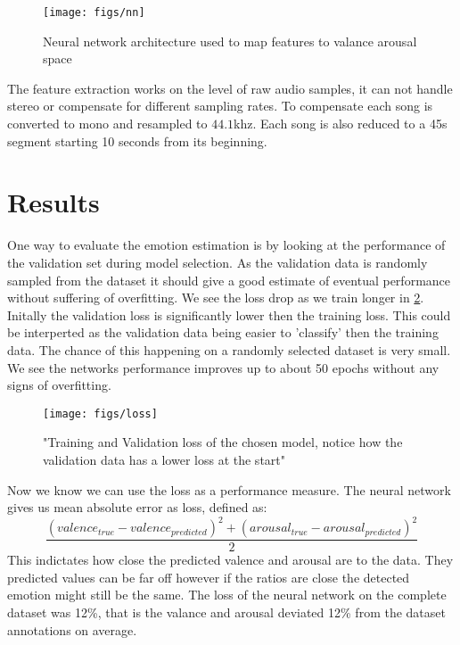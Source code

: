 \documentclass[lang=en, hanging-titles=true]{skrapport}
\begin{document}
\begin{figure}[h]
	\centering
	\texttt{[image: figs/nn]}
	\caption{Neural network architecture used to map features to valance arousal space}
	\label{fig:nn}
\end{figure}

The feature extraction works on the level of raw audio samples, it can not handle stereo or compensate for different sampling rates. To compensate each song is converted to mono and resampled to $44.1$khz. Each song is also reduced to a 45s segment starting 10 seconds from its beginning.

\section{Results}
One way to evaluate the emotion estimation is by looking at the performance of the validation set during model selection. As the validation data is randomly sampled from the dataset it should give a good estimate of eventual performance without suffering of overfitting. We see the loss drop as we train longer in \cref{fig:loss}. Initally the validation loss is significantly lower then the training loss. This could be interperted as the validation data being easier to 'classify' then the training data. The chance of this happening on a randomly selected dataset is very small. We see the networks performance improves up to about 50 epochs without any signs of overfitting. 

\begin{figure}[htbp]
	\centering
	\texttt{[image: figs/loss]}
	\caption{"Training and Validation loss of the chosen model, notice how the validation data has a lower loss at the start"}
	\label{fig:loss}
\end{figure}

Now we know we can use the loss as a performance measure. The neural network gives us mean absolute error as loss, defined as: 
\begin{equation*}
	\frac{(valence_{true} - valence_{predicted})^2 + (arousal_{true} - arousal_{predicted})^2}{2}
\end{equation*}
This indictates how close the predicted valence and arousal are to the data. They predicted values can be far off however if the ratios are close the detected emotion might still be the same. The loss of the neural network on the complete dataset was 12\%, that is the valance and arousal deviated 12\% from the dataset annotations on average.
\end{document}
